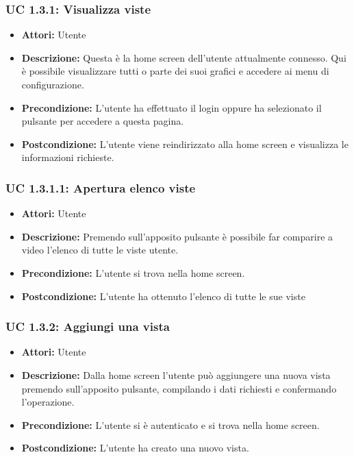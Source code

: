 \subsubsection{UC 1.3.1: Visualizza viste}

\begin{itemize}
\item \textbf{Attori:} Utente
\item \textbf{Descrizione:} Questa è la home screen dell'utente attualmente connesso. Qui è possibile visualizzare tutti o parte dei suoi grafici e accedere ai menu di configurazione.
\item \textbf{Precondizione:} L'utente ha effettuato il login oppure ha selezionato il pulsante per accedere a questa pagina.
\item \textbf{Postcondizione:} L'utente viene reindirizzato alla home screen e visualizza le informazioni richieste.
\end{itemize}

\subsubsection{UC 1.3.1.1: Apertura elenco viste}

\begin{itemize}
\item \textbf{Attori:} Utente
\item \textbf{Descrizione:} Premendo sull'apposito pulsante è possibile far comparire a video l'elenco di tutte le viste utente.
\item \textbf{Precondizione:} L'utente si trova nella home screen.
\item \textbf{Postcondizione:} L'utente ha ottenuto l'elenco di tutte le sue viste
\end{itemize}

\subsubsection{UC 1.3.2: Aggiungi una vista}

\begin{itemize}
\item \textbf{Attori:} Utente
\item \textbf{Descrizione:} Dalla home screen l'utente può aggiungere una nuova vista premendo sull'apposito pulsante, compilando i dati richiesti e confermando l'operazione.
\item \textbf{Precondizione:} L'utente si è autenticato e si trova nella home screen.
\item \textbf{Postcondizione:} L'utente ha creato una nuovo vista.
\end{itemize}

